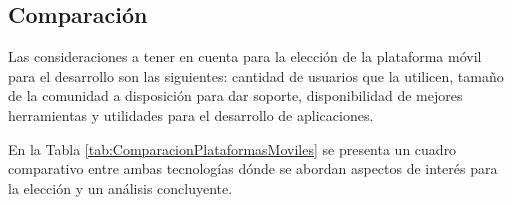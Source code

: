     \subsection{Comparación}
        \par Las consideraciones a tener en cuenta para la elección de la plataforma móvil para el desarrollo son las siguientes: cantidad de usuarios que la utilicen, tamaño de la comunidad a disposición para dar soporte, disponibilidad de mejores herramientas y utilidades para el desarrollo de aplicaciones.
        
        \par En la Tabla \ref{tab:ComparacionPlataformasMoviles} se presenta un cuadro comparativo entre ambas tecnologías dónde se abordan aspectos de interés para la elección y un análisis concluyente.
        
